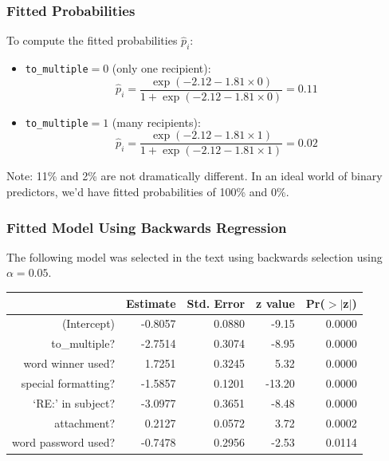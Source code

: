 \documentclass[slides]{beamer}
\begin{document}
\begin{frame}[fragile]
\frametitle{Fitted Probabilities}
To compute the fitted probabilities $\widehat{p}_i$:
\begin{itemize}
\item {\tt to\_multiple}$ = 0$ (only one recipient):
\[
\widehat{p}_i = \frac{\exp(-2.12 - 1.81 \times 0)}{1 + \exp(-2.12 - 1.81 \times 0)} = 0.11
\]
\item {\tt to\_multiple}$ = 1$ (many recipients):
\[
\widehat{p}_i = \frac{\exp(-2.12 - 1.81 \times 1)}{1 + \exp(-2.12 - 1.81 \times 1)} = 0.02
\]
\end{itemize}
\pause
Note:  11\% and 2\% are not dramatically different.  In an ideal world of binary predictors, we'd have fitted probabilities of 100\% and 0\%.  

\end{frame}


\begin{frame}[fragile]
\frametitle{Fitted Model Using Backwards Regression}
The following model was selected in the text using backwards selection using $\alpha=0.05$.

\begin{table}[ht]
\centering
\begin{tabular}{r|rrrr}
  \hline
 & Estimate & Std. Error & z value & Pr($>$$|$z$|$) \\ 
  \hline
(Intercept) & -0.8057 & 0.0880 & -9.15 & 0.0000 \\ 
  to\_multiple? & -2.7514 & 0.3074 & -8.95 & 0.0000 \\ 
  word winner used? & 1.7251 & 0.3245 & 5.32 & 0.0000 \\ 
  special formatting? & -1.5857 & 0.1201 & -13.20 & 0.0000 \\ 
  `RE:' in subject? & -3.0977 & 0.3651 & -8.48 & 0.0000 \\ 
  attachment? & 0.2127 & 0.0572 & 3.72 & 0.0002 \\ 
  word password used? & -0.7478 & 0.2956 & -2.53 & 0.0114 \\ 
   \hline
\end{tabular}
\end{table} 

\end{frame}
\end{document}
